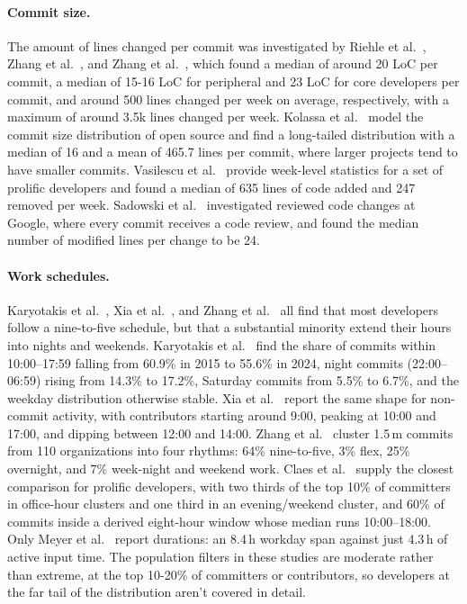 \documentclass[smallextended]{svjour3}
\begin{document}
\paragraph{Commit size.}
The amount of lines changed per commit was investigated by Riehle et al.~\cite{riehle2012developer}, Zhang et al.~\cite{zhang2024how}, and Zhang et al.~\cite{zhang2024workrhythms}, which found a median of around 20 LoC per commit, a median of 15-16 LoC for peripheral and 23 LoC for core developers per commit, and around 500 lines changed per week on average, respectively, with a maximum of around 3.5k lines changed per week.
Kolassa et al.~\cite{kolassa2013model} model the commit size distribution of open source and find a long-tailed distribution with a median of 16 and a mean of 465.7 lines per commit, where larger projects tend to have smaller commits.
Vasilescu et al.~\cite{Vasilescu2016sky} provide week-level statistics for a set of prolific developers and found a median of 635 lines of code added and 247 removed per week.
Sadowski et al.~\cite{sadowski2018modern} investigated reviewed code changes at Google, where every commit receives a code review, and found the median number of modified lines per change to be 24.

\paragraph{Work schedules.}
Karyotakis et al.~\cite{Karyotakis2026}, Xia et al.~\cite{xia2022exploring}, and Zhang et al.~\cite{zhang2024workrhythms} all find that most developers follow a nine-to-five schedule, but that a substantial minority extend their hours into nights and weekends.
Karyotakis et al.~\cite{Karyotakis2026} find the share of commits within 10:00--17:59 falling from 60.9\% in 2015 to 55.6\% in 2024, night commits (22:00--06:59) rising from 14.3\% to 17.2\%, Saturday commits from 5.5\% to 6.7\%, and the weekday distribution otherwise stable.
Xia et al.~\cite{xia2022exploring} report the same shape for non-commit activity, with contributors starting around 9:00, peaking at 10:00 and 17:00, and dipping between 12:00 and 14:00.
Zhang et al.~\cite{zhang2024workrhythms} cluster 1.5\,m commits from 110 organizations into four rhythms: 64\% nine-to-five, 3\% flex, 25\% overnight, and 7\% week-night and weekend work.
Claes et al.~\cite{claes2018night} supply the closest comparison for prolific developers, with two thirds of the top 10\% of committers in office-hour clusters and one third in an evening/weekend cluster, and 60\% of commits inside a derived eight-hour window whose median runs 10:00--18:00.
Only Meyer et al.~\cite{meyer2017worklife} report durations: an 8.4\,h workday span against just 4.3\,h of active input time.
The population filters in these studies are moderate rather than extreme, at the top 10-20\% of committers or contributors, so developers at the far tail of the distribution aren't covered in detail.
\end{document}
